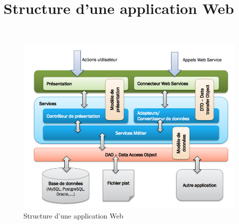 \pagebreak

\section{Structure d'une application Web}\label{Annexe C}\\


\begin{figure}[!h]
\centering
\includegraphics[width=\textwidth]{images/WebAppArchitecture.png}
\caption{\label{WebAppArchitecture}Structure d'une application Web}
\end{figure} 


